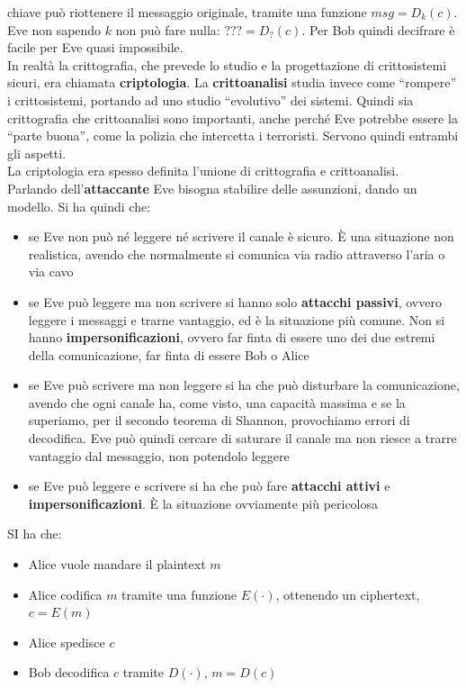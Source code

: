 \documentclass[a4paper,12pt, oneside]{book}
\begin{document}
chiave può riottenere il messaggio originale, tramite una funzione
$msg=D_k(c)$. Eve non sapendo $k$ non può fare nulla: $???=D_?(c)$.
Per Bob quindi decifrare è facile per Eve quasi impossibile.\\
In realtà la crittografia, che prevede lo studio e la progettazione di
crittosistemi sicuri, era chiamata \textbf{criptologia}. La
\textbf{crittoanalisi} studia invece come ``rompere'' i crittosistemi, portando
ad uno studio ``evolutivo'' dei sistemi. Quindi sia crittografia che
crittoanalisi sono importanti, anche perché Eve potrebbe essere la ``parte
buona'', come la polizia che intercetta i terroristi. Servono quindi entrambi
gli aspetti.\\
La criptologia era spesso definita l'unione di crittografia e crittoanalisi.\\
Parlando dell'\textbf{attaccante} Eve bisogna stabilire delle assunzioni, dando
un modello. Si ha quindi che:
\begin{itemize}
  \item se Eve non può né leggere né scrivere il canale è sicuro. È una
  situazione non realistica, avendo che normalmente si comunica via radio
  attraverso l'aria o via cavo
  \item se Eve può leggere ma non scrivere si hanno solo \textbf{attacchi
    passivi}, ovvero leggere i messaggi e trarne vantaggio, ed è
  la situazione più comune. Non si hanno \textbf{impersonificazioni}, ovvero far
  finta di essere uno dei due estremi della comunicazione, far finta di essere
  Bob o Alice
  \item se Eve può scrivere ma non leggere si ha che può disturbare la
  comunicazione, avendo che ogni canale ha, come visto, una capacità massima e
  se la superiamo, per il secondo teorema di Shannon, provochiamo errori di
  decodifica. Eve può quindi cercare di saturare il canale ma non riesce a
  trarre vantaggio dal messaggio, non potendolo leggere
  \item se Eve può leggere e scrivere si ha che può fare \textbf{attacchi
    attivi} e \textbf{impersonificazioni}. È la situazione ovviamente più
  pericolosa 
\end{itemize}
SI ha che:
\begin{itemize}
  \item Alice vuole mandare il plaintext $m$
  \item Alice codifica $m$ tramite una funzione $E(\cdot)$, ottenendo un
  ciphertext, $c=E(m)$ 
  \item Alice spedisce $c$
  \item Bob decodifica $c$ tramite $D(\cdot)$, $m=D(c)$
\end{itemize}
\end{document}
